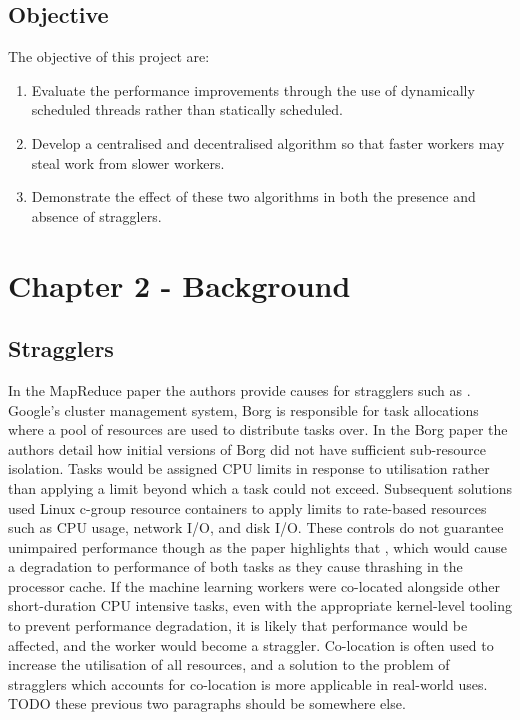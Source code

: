 \documentclass[12pt]{article}
\begin{document}
\newpage

\subsection{Objective}
The objective of this project are:

\begin{enumerate}
\item Evaluate the performance improvements through the use of dynamically scheduled threads rather than statically scheduled.
\item Develop a centralised and decentralised algorithm so that faster workers may steal work from slower workers.
\item Demonstrate the effect of these two algorithms in both the presence and absence of stragglers.
\end{enumerate}

\newpage

\section{Chapter 2 - Background}

\subsection{Stragglers}

In the MapReduce paper \citep{dean2008mapreduce} the authors provide causes for stragglers such as . Google's cluster management system, Borg \cite{43438} is responsible for task allocations where a pool of resources are used to distribute tasks over. In the Borg paper the authors detail how initial versions of Borg did not have sufficient sub-resource isolation. Tasks would be assigned CPU limits in response to utilisation rather than applying a limit beyond which a task could not exceed. Subsequent solutions used Linux c-group resource containers to apply limits to rate-based resources such as CPU usage, network I/O, and disk I/O. These controls do not guarantee unimpaired performance though as the paper highlights that , which would cause a degradation to performance of both tasks as they cause thrashing in the processor cache.
\newline
If the machine learning workers were co-located alongside other short-duration CPU intensive tasks, even with the appropriate kernel-level tooling to prevent performance degradation, it is likely that performance would be affected, and the worker would become a straggler. Co-location is often used to increase the utilisation of all resources, and a solution to the problem of stragglers which accounts for co-location is more applicable in real-world uses. TODO these previous two paragraphs should be somewhere else.
\end{document}
